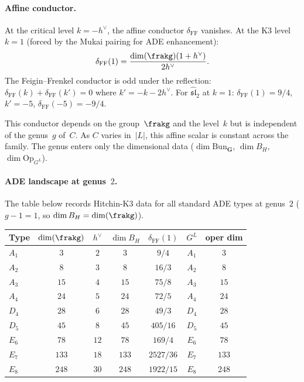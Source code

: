 \paragraph{Affine conductor.}
At the critical level $k = -h^\vee$, the affine conductor $\delta_{\mathrm{FF}}$ vanishes. At the K3 level $k = 1$ (forced by the Mukai pairing for ADE enhancement):
\[
 \delta_{\mathrm{FF}}(1) = \frac{\dim(\frakg)(1 + h^\vee)}{2h^\vee}.
\]
The Feigin--Frenkel conductor is odd under the reflection: $\delta_{\mathrm{FF}}(k) + \delta_{\mathrm{FF}}(k') = 0$ where $k' = -k - 2h^\vee$. For $\hat{\mathfrak{sl}}_2$ at $k = 1$: $\delta_{\mathrm{FF}}(1) = 9/4$, $k' = -5$, $\delta_{\mathrm{FF}}(-5) = -9/4$.

This conductor depends on the group~$\frakg$ and the level~$k$ but is independent of the genus~$g$ of~$C$. As $C$ varies in~$|L|$, this affine scalar is constant across the family. The genus enters only the dimensional data ($\dim\mathrm{Bun}_\mathbf{G}$, $\dim B_H$, $\dim\mathrm{Op}_{G^L}$).

\paragraph{ADE landscape at genus~\texorpdfstring{$2$}{2}.}
The table below records Hitchin-K3 data for all standard ADE types at genus~$2$ ($g - 1 = 1$, so $\dim B_H = \dim(\frakg)$).

\begin{center}
\begin{tabular}{lcccccc}
Type & $\dim(\frakg)$ & $h^\vee$ & $\dim B_H$ & $\delta_{\mathrm{FF}}(1)$ & $G^L$ & oper dim \\
\hline
$A_1$ & $3$ & $2$ & $3$ & $9/4$ & $A_1$ & $3$ \\
$A_2$ & $8$ & $3$ & $8$ & $16/3$ & $A_2$ & $8$ \\
$A_3$ & $15$ & $4$ & $15$ & $75/8$ & $A_3$ & $15$ \\
$A_4$ & $24$ & $5$ & $24$ & $72/5$ & $A_4$ & $24$ \\
$D_4$ & $28$ & $6$ & $28$ & $49/3$ & $D_4$ & $28$ \\
$D_5$ & $45$ & $8$ & $45$ & $405/16$ & $D_5$ & $45$ \\
$E_6$ & $78$ & $12$ & $78$ & $169/4$ & $E_6$ & $78$ \\
$E_7$ & $133$ & $18$ & $133$ & $2527/36$ & $E_7$ & $133$ \\
$E_8$ & $248$ & $30$ & $248$ & $1922/15$ & $E_8$ & $248$
\end{tabular}
\end{center}

